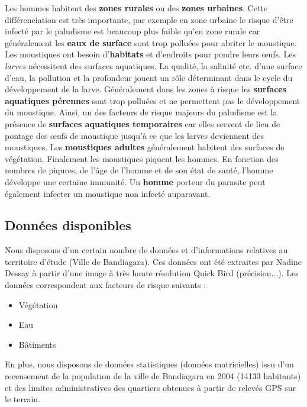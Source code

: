 Les hommes habitent des \textbf{zones rurales} ou des \textbf{zones urbaines}. Cette différenciation est très importante, par exemple en zone urbaine le risque d'être infecté par le paludisme est beaucoup plus faible qu'en zone rurale car généralement les \textbf{eaux de surface} sont trop polluées pour abriter le moustique.
Les moustiques ont besoin d'\textbf{habitats} et d'endroits pour pondre leurs œufs. Les \textit{larves} nécessitent des surfaces aquatiques. La qualité, la salinité etc. d'une surface d'eau, la pollution et la profondeur jouent un rôle déterminant dans le cycle du développement de la larve. Généralement dans les zones à risque les \textbf{surfaces aquatiques pérennes} sont trop polluées et ne permettent pas le développement du moustique. Ainsi, un des facteurs de risque majeurs du paludisme est la présence de \textbf{surfaces aquatiques temporaires} car elles servent de lieu de pontage des œufs de moustique jusqu'à ce que les larves deviennent des moustiques. Les \textbf{moustiques adultes} généralement habitent des surfaces de végétation.
Finalement les moustiques piquent les hommes. En fonction des nombres de piqures, de l'âge de l'homme et de son état de santé, l'homme développe une certaine immunité. Un \textbf{homme} porteur du parasite peut également infecter un moustique non infecté auparavant.

\subsection{Données disponibles}

Nous disposons d'un certain nombre de données et d'informations relatives au territoire d'étude (Ville de Bandiagara). Ces données ont été extraites par Nadine Dessay à partir d'une image à très haute résolution Quick Bird (précision...). Les données correspondent aux facteurs de risque suivants :\\
\begin{itemize}
\item Végétation
\item Eau
\item Bâtiments\\
\end{itemize} 

En plus, nous disposons de données statistiques (données matricielles) issu d'un recensement de la population de la ville de Bandiagara en 2004 (14133 habitants) et des limites administratives des quartiers obtenues à partir de relevés GPS sur le terrain.\\

